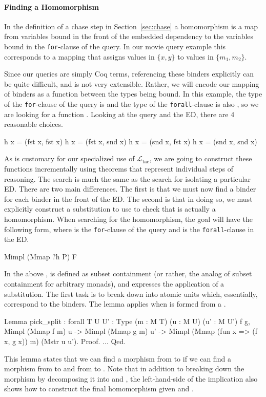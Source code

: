 \documentclass[preprint]{sigplanconf}
\newcommand{\ltac}[0]{\ensuremath{\mathcal{L}_{\mathrm{tac}}}}
\begin{document}
\paragraph{Finding a Homomorphism}
In the definition of a chase step in Section~\ref{sec:chase} a homomorphism is a map from variables bound in the front of the embedded dependency to the variables bound in the {\tt for}-clause of the query.  In our movie query example this corresponds to a mapping that assigns values in $\{x,y\}$ to values in $\{m_1,m_2\}$.

Since our queries are simply Coq terms, referencing these binders explicitly can be quite difficult, and is not very extensible.
Rather, we will encode our mapping of binders as a function between the types being bound.
In this example, the type of the {\tt for}-clause of the query is  and the type of the {\tt forall}-clause is also , so we are looking for a function .
Looking at the query and the ED, there are 4 reasonable choices.
\begin{coq}
h x = (fst x, fst x)
h x = (fst x, snd x)
h x = (snd x, fst x)
h x = (snd x, snd x)
\end{coq}

As is customary for our specialized use of \ltac, we are going to construct these functions incrementally using theorems that represent individual steps of reasoning.
The search is much the same as the search for isolating a particular ED.
There are two main differences.
The first is that we must now find a binder for each binder in the front of the ED.
The second is that in doing so, we must explicitly construct a substitution  to use to check that  is actually a homomorphism.
When searching for the homomorphism, the goal will have the following form, where  is the {\tt for}-clause of the query and  is the {\tt forall}-clause in the ED.
\begin{coq}
Mimpl (Mmap ?h P) F
\end{coq}
In the above , is defined as subset containment (or rather, the analog of subset containment for arbitrary monads), and  expresses the application of a substitution.  The first task is to break  down into atomic units which, essentially, correspond to the binders.
The  lemma applies when  is formed from a .
\begin{coq}
Lemma pick_split
: forall {T U U' : Type} (m : M T) (u : M U) (u' : M U') f g,
  Mimpl (Mmap f m) u ->
  Mimpl (Mmap g m) u' ->
  Mimpl (Mmap (fun x => (f x, g x)) m) (Mstr u u').
Proof. ... Qed.
\end{coq}
This lemma states that we can find a morphism from  to  if we can find a morphism from  to  and from  to .
Note that in addition to breaking down the morphism by decomposing it into  and , the left-hand-side of the implication also shows how to construct the final homomorphism given  and .
\end{document}

